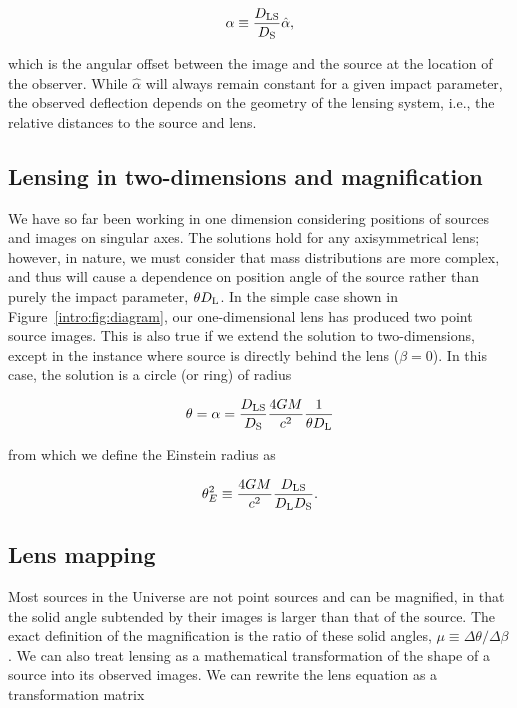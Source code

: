 \begin{equation}
\alpha \equiv  \frac{D_\mathrm{LS}}{D_\mathrm{S}} \hat\alpha,
\label{intro:eqn:dlsds}
\end{equation}

\noindent which is the angular offset between the image and the source at the location of the observer. While $\hat\alpha$ will always remain constant for a given impact parameter, the observed deflection depends on the geometry of the lensing system, i.e., the relative distances to the source and lens.

\subsection{Lensing in two-dimensions and magnification}
\label{intro:sec:magnification}

We have so far been working in one dimension considering positions of sources and images on singular axes. The solutions hold for any axisymmetrical lens; however, in nature, we must consider that mass distributions are more complex, and thus will cause a dependence on position angle of the source rather than purely the impact parameter, $\theta D_\mathrm{L}$. In the simple case shown in Figure~\ref{intro:fig:diagram}, our one-dimensional lens has produced two point source images. This is also true if we extend the solution to two-dimensions, except in the instance where source is directly behind the lens ($\beta=0$). In this case, the solution is a circle (or ring) of radius

\begin{equation}
\theta = \alpha = \frac{D_\mathrm{LS}}{D_\mathrm{S}} \frac{4GM}{c^2} \frac{1}{\theta D_\mathrm{L}}
\end{equation} 

\noindent from which we define the Einstein radius as

\begin{equation}
\theta_E^2 \equiv \frac{4GM}{c^2} \frac{D_\mathrm{LS}}{D_\mathrm{L}D_\mathrm{S}}.
\label{intro:eqn:einstein_radius}
\end{equation}

\subsection{Lens mapping}

Most sources in the Universe are not point sources and can be magnified, in that the solid angle subtended by their images is larger than that of the source. The exact definition of the magnification is the ratio of these solid angles,
$\mu \equiv \Delta \theta/\Delta \beta$. We can also treat lensing as a mathematical transformation of the shape of a source into its observed images. We can rewrite the lens equation as a transformation matrix


